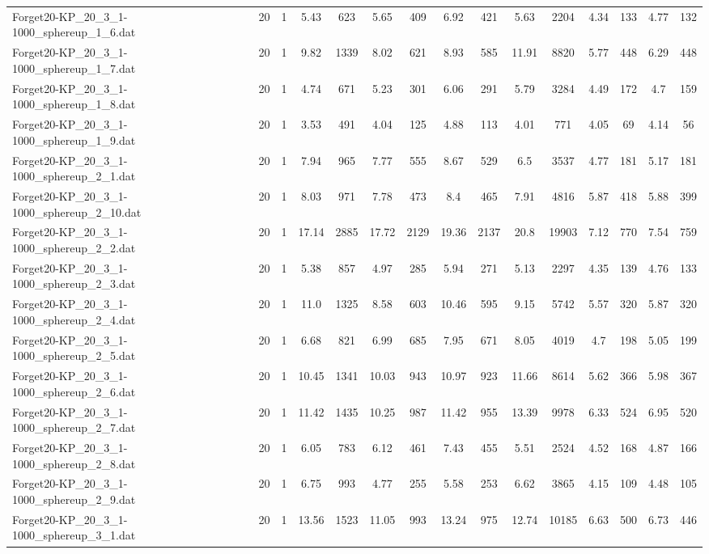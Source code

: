 \begin{table}[!ht]
{\begin{tabular}{lcccccccccccccc}
Forget20-KP\_20\_3\_1-1000\_sphereup\_1\_6.dat & 20 & 1 & 5.43 & 623 & 5.65 & 409 & 6.92 & 421 & 5.63 & 2204 & 4.34 & 133 & 4.77 & 132 \\
Forget20-KP\_20\_3\_1-1000\_sphereup\_1\_7.dat & 20 & 1 & 9.82 & 1339 & 8.02 & 621 & 8.93 & 585 & 11.91 & 8820 & 5.77 & 448 & 6.29 & 448 \\
Forget20-KP\_20\_3\_1-1000\_sphereup\_1\_8.dat & 20 & 1 & 4.74 & 671 & 5.23 & 301 & 6.06 & 291 & 5.79 & 3284 & 4.49 & 172 & 4.7 & 159 \\
Forget20-KP\_20\_3\_1-1000\_sphereup\_1\_9.dat & 20 & 1 & 3.53 & 491 & 4.04 & 125 & 4.88 & 113 & 4.01 & 771 & 4.05 & 69 & 4.14 & 56 \\
Forget20-KP\_20\_3\_1-1000\_sphereup\_2\_1.dat & 20 & 1 & 7.94 & 965 & 7.77 & 555 & 8.67 & 529 & 6.5 & 3537 & 4.77 & 181 & 5.17 & 181 \\
Forget20-KP\_20\_3\_1-1000\_sphereup\_2\_10.dat & 20 & 1 & 8.03 & 971 & 7.78 & 473 & 8.4 & 465 & 7.91 & 4816 & 5.87 & 418 & 5.88 & 399 \\
Forget20-KP\_20\_3\_1-1000\_sphereup\_2\_2.dat & 20 & 1 & 17.14 & 2885 & 17.72 & 2129 & 19.36 & 2137 & 20.8 & 19903 & 7.12 & 770 & 7.54 & 759 \\
Forget20-KP\_20\_3\_1-1000\_sphereup\_2\_3.dat & 20 & 1 & 5.38 & 857 & 4.97 & 285 & 5.94 & 271 & 5.13 & 2297 & 4.35 & 139 & 4.76 & 133 \\
Forget20-KP\_20\_3\_1-1000\_sphereup\_2\_4.dat & 20 & 1 & 11.0 & 1325 & 8.58 & 603 & 10.46 & 595 & 9.15 & 5742 & 5.57 & 320 & 5.87 & 320 \\
Forget20-KP\_20\_3\_1-1000\_sphereup\_2\_5.dat & 20 & 1 & 6.68 & 821 & 6.99 & 685 & 7.95 & 671 & 8.05 & 4019 & 4.7 & 198 & 5.05 & 199 \\
Forget20-KP\_20\_3\_1-1000\_sphereup\_2\_6.dat & 20 & 1 & 10.45 & 1341 & 10.03 & 943 & 10.97 & 923 & 11.66 & 8614 & 5.62 & 366 & 5.98 & 367 \\
Forget20-KP\_20\_3\_1-1000\_sphereup\_2\_7.dat & 20 & 1 & 11.42 & 1435 & 10.25 & 987 & 11.42 & 955 & 13.39 & 9978 & 6.33 & 524 & 6.95 & 520 \\
Forget20-KP\_20\_3\_1-1000\_sphereup\_2\_8.dat & 20 & 1 & 6.05 & 783 & 6.12 & 461 & 7.43 & 455 & 5.51 & 2524 & 4.52 & 168 & 4.87 & 166 \\
Forget20-KP\_20\_3\_1-1000\_sphereup\_2\_9.dat & 20 & 1 & 6.75 & 993 & 4.77 & 255 & 5.58 & 253 & 6.62 & 3865 & 4.15 & 109 & 4.48 & 105 \\
Forget20-KP\_20\_3\_1-1000\_sphereup\_3\_1.dat & 20 & 1 & 13.56 & 1523 & 11.05 & 993 & 13.24 & 975 & 12.74 & 10185 & 6.63 & 500 & 6.73 & 446 \\

\end{tabular}}
\end{table}

